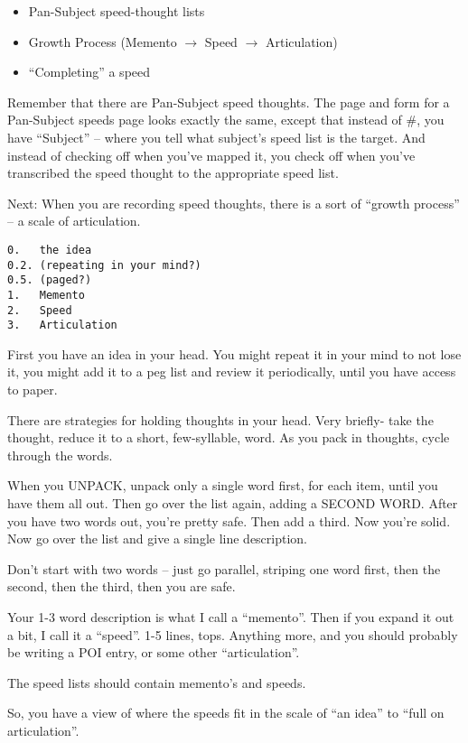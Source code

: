 \documentclass[oneside,fontsize=13]{scrbook}
\begin{document}
\begin{itemize}
  \item Pan-Subject speed-thought lists
  \item Growth Process (Memento $\rightarrow$ Speed $\rightarrow$ Articulation)
  \item ``Completing'' a speed
\end{itemize}

Remember that there are Pan-Subject speed thoughts. The page and form
for a Pan-Subject speeds page looks exactly the same, except that
instead of \#, you have ``Subject'' -- where you tell what subject's speed
list is the target. And instead of checking off when you've mapped it,
you check off when you've transcribed the speed thought to the
appropriate speed list.

Next: When you are recording speed thoughts, there is a sort of
``growth process'' -- a scale of articulation.

\begin{verbatim}
0.   the idea
0.2. (repeating in your mind?)
0.5. (paged?)
1.   Memento
2.   Speed
3.   Articulation
\end{verbatim}

First you have an idea in your head. You might repeat it in your mind
to not lose it, you might add it to a peg list and review it
periodically, until you have access to paper.

There are strategies for holding thoughts in your head. Very briefly-
take the thought, reduce it to a short, few-syllable, word. As you
pack in thoughts, cycle through the words.

When you UNPACK, unpack only a single word first, for each item, until
you have them all out. Then go over the list again, adding a SECOND
WORD. After you have two words out, you're pretty safe. Then add a
third. Now you're solid. Now go over the list and give a single line
description.

Don't start with two words -- just go parallel, striping one word first,
then the second, then the third, then you are safe.

Your 1-3 word description is what I call a ``memento''. Then if you
expand it out a bit, I call it a ``speed''. 1-5 lines, tops. Anything
more, and you should probably be writing a POI entry, or some other
``articulation''.

The speed lists should contain memento's and speeds.

So, you have a view of where the speeds fit in the scale of ``an idea''
to ``full on articulation''.
\end{document}
